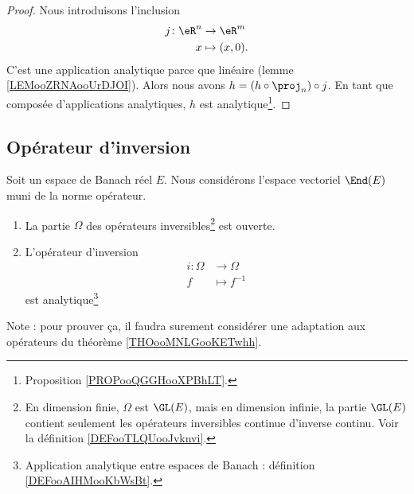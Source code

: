 \begin{proof}
	Nous introduisons l'inclusion
	\begin{equation}
		\begin{aligned}
			j\colon \eR^n & \to \eR^m      \\
			x             & \mapsto (x,0).
		\end{aligned}
	\end{equation}
	C'est une application analytique parce que linéaire (lemme \ref{LEMooZRNAooUrDJOI}). Alors nous avons \( h=(h\circ\proj_n)\circ j\). En tant que composée d'applications analytiques, \( h\) est analytique\footnote{Proposition \ref{PROPooQGGHooXPBhLT}.}.
\end{proof}


\subsection{Opérateur d'inversion}

\begin{proposition}	\label{PROPooSGVWooQupJxn}
	Soit un espace de Banach réel \( E\). Nous considérons l'espace vectoriel \( \End(E)\) muni de la norme opérateur.
	\begin{enumerate}
		\item
		      La partie \( \Omega\) des opérateurs inversibles\footnote{En dimension finie, \( \Omega\) est \( \GL(E)\), mais en dimension infinie, la partie \( \GL(E)\) contient seulement les opérateurs inversibles continue d'inverse continu. Voir la définition \ref{DEFooTLQUooJvknvi}.} est ouverte.
		\item
		      L'opérateur d'inversion
		      \begin{equation}
			      \begin{aligned}
				      i\colon \Omega & \to \Omega     \\
				      f              & \mapsto f^{-1}
			      \end{aligned}
		      \end{equation}
		      est analytique\footnote{Application analytique entre espaces de Banach : définition \ref{DEFooAIHMooKbWsBt}.}
	\end{enumerate}
\end{proposition}
Note : pour prouver ça, il faudra surement considérer une adaptation aux opérateurs du théorème \ref{THOooMNLGooKETwhh}.


